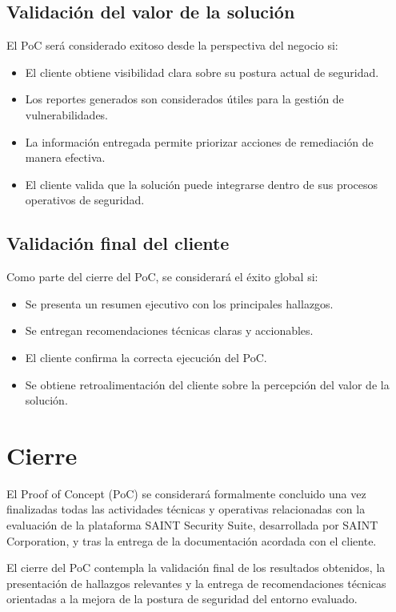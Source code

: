 \documentclass[a4paper]{article}
\begin{document}
    \subsection{Validación del valor de la solución}
    El PoC será considerado exitoso desde la perspectiva del negocio si:\\
    \begin{itemize}
        \item El cliente obtiene visibilidad clara sobre su postura actual de seguridad.
        \item Los reportes generados son considerados útiles para la gestión de vulnerabilidades.
        \item La información entregada permite priorizar acciones de remediación de manera efectiva.
        \item El cliente valida que la solución puede integrarse dentro de sus procesos operativos de seguridad.
    \end{itemize}

    \subsection{Validación final del cliente}
    Como parte del cierre del PoC, se considerará el éxito global si:\\
    \begin{itemize}
        \item Se presenta un resumen ejecutivo con los principales hallazgos.
        \item Se entregan recomendaciones técnicas claras y accionables.
        \item El cliente confirma la correcta ejecución del PoC.
        \item Se obtiene retroalimentación del cliente sobre la percepción del valor de la solución.
    \end{itemize}

    \section{Cierre}
    El Proof of Concept (PoC) se considerará formalmente concluido una vez finalizadas todas las actividades técnicas y operativas relacionadas con la evaluación de la plataforma SAINT Security Suite, desarrollada por SAINT Corporation, y tras la entrega de la documentación acordada con el cliente.
    
    El cierre del PoC contempla la validación final de los resultados obtenidos, la presentación de hallazgos relevantes y la entrega de recomendaciones técnicas orientadas a la mejora de la postura de seguridad del entorno evaluado.
\end{document}
